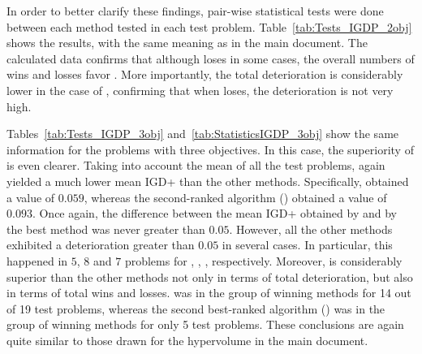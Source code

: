 In order to better clarify these findings, pair-wise statistical tests were done between each method tested in each 
test problem.
%
Table~\ref{tab:Tests_IGDP_2obj} shows the results, with the same meaning as in the main document.
%
The calculated data confirms that although \VSDMOEA{} loses in some cases, the overall numbers of wins and losses favor \VSDMOEA{}.
%
More importantly, the total deterioration is considerably lower in the case of \VSDMOEA{}, confirming that 
when \VSDMOEA{} loses, the deterioration is not very high.

Tables~\ref{tab:Tests_IGDP_3obj} and~\ref{tab:StatisticsIGDP_3obj} show the same information for the problems with three objectives.
%
In this case, the superiority of \VSDMOEA{} is even clearer.
%
Taking into account the mean of all the test problems, \VSDMOEA{} again yielded a much lower mean IGD+ than the other methods.
%
Specifically, \VSDMOEA{} obtained a value of $0.059$, whereas the second-ranked algorithm (\RMOEA{}) obtained a value of $0.093$.
%
Once again, the difference between the mean IGD+ obtained by \VSDMOEA{} and by the best method was never greater
than $0.05$.
%
However, all the other methods exhibited a deterioration greater than $0.05$ in several cases.
%
In particular, this happened in $5$, $8$ and $7$ problems for \MOEAD{}, \NSGAII{}, \RMOEA{}, respectively.
%
Moreover, \VSDMOEA{} is considerably superior than the other methods not only in terms of total deterioration, but also
in terms of total wins and losses.
%
\VSDMOEA{} was in the group of winning methods for 14 out of 19 test problems, whereas the second best-ranked algorithm (\RMOEA{})
was in the group of winning methods for only 5 test problems.
%
These conclusions are again quite similar to those drawn for the hypervolume in the main document.



